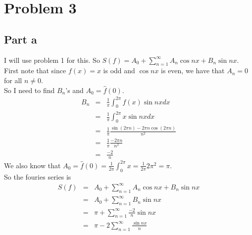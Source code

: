\documentclass[12pt]{article}
\begin{document}
\clearpage
\section*{Problem 3}
\subsection*{Part a}
I will use problem 1 for this. So $S(f)=A_0+\sum_{n=1}^{\infty}A_n\cos nx+ B_n\sin nx$.
\\
First note that since $f(x)=x$ is odd and $\cos nx$ is even, we have that $A_n=0$ for all
$n \not=0$.  \\
So I need to find $B_n$'s and $A_0=\hat{f}(0)$. 
\begin{eqnarray*}
B_n &=& 
\frac{1}{\pi} \int_0^{2\pi} f(x) \sin nx dx \\ &=&
\frac{1}{\pi} \int_0^{2\pi} x \sin nx dx \\ &=&
\frac{1}{\pi} \frac{\sin (2\pi n)-2\pi n\cos (2\pi n)}{n^2} \\&=&
\frac{1}{\pi} \frac{-2\pi n}{n^2} \\ &=&
\frac{-2}{n}
\end{eqnarray*}
We also know that $A_0=\hat{f}(0)=\frac{1}{2\pi}\int_0^{2\pi} x=\frac{1}{2\pi}2\pi^2=\pi$. \\
So the fouries series is
\begin{eqnarray*}
S(f) &=& A_0+\sum_{n=1}^{\infty}A_n\cos nx+ B_n\sin nx \\
&=& A_0+\sum_{n=1}^{\infty} B_n\sin nx \\ &=&
\pi+\sum_{n=1}^{\infty} \frac{-2}{n}\sin nx \\&=&
\pi-2\sum_{n=1}^{\infty}\frac{\sin nx}{n}
\end{eqnarray*}

\clearpage
\end{document}
